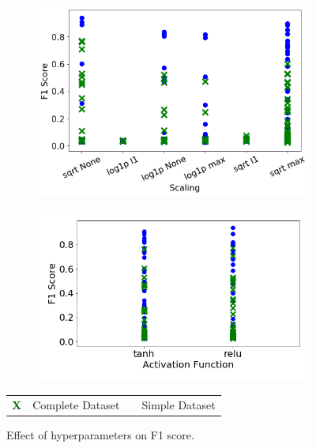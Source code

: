 \begin{figure}[H]
    \begin{subfigure}[b]{0.49\textwidth}
        \centering
        \includegraphics[width=\textwidth]{images/dnn_scaler.png}
         \caption{}
        \label{fig:dnn_scaler}
    \end{subfigure}
    \hfill
    \begin{subfigure}[b]{0.49\textwidth}
        \centering
        \includegraphics[width=\textwidth]{images/dnn_activation_function.png}
         \caption{}
        \label{fig:dnn_activation_function}
    \end{subfigure}
        \begin{tabular}{r@{ : }l r@{ : }l}
			\textcolor{darkgreen}{\textbf{\large{X}}} & Complete Dataset & \bluecircle & Simple Dataset \\
		\end{tabular}
        \caption{Effect of hyperparameters on F1 score.}
        \label{fig:dense_hyperparameters_f1_score}
\end{figure}


